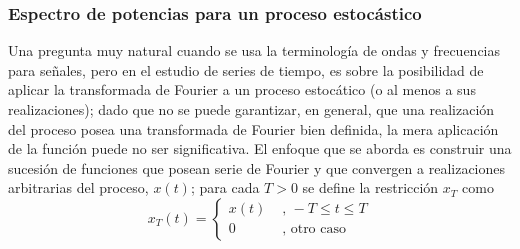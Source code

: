 \documentclass[12pt,a4paper]{mitthesis}
\begin{document}

\subsubsection{Espectro de potencias para un proceso estoc\'astico}

Una pregunta muy natural cuando se usa la terminolog\'ia de ondas y frecuencias para se\~nales,
pero en el estudio de series de tiempo, es sobre la posibilidad de aplicar la transformada de 
Fourier a un proceso estoc\'atico (o al menos a sus realizaciones); dado que no se puede 
garantizar, en general, que una realizaci\'on del proceso posea una transformada de Fourier bien 
definida, la mera aplicaci\'on de la funci\'on puede no ser significativa.
El enfoque que se aborda es construir una sucesi\'on de funciones que posean serie de Fourier y que 
convergen a realizaciones arbitrarias del proceso, $x(t)$; para cada $T>0$ se define la 
restricci\'on $x_T$ como
\begin{equation*}
x_T(t) = 
\begin{cases}
x(t) & \text{ , } -T\leq t \leq T \\
0 & \text{ , otro caso}
\end{cases}
\end{equation*}
\end{document}
